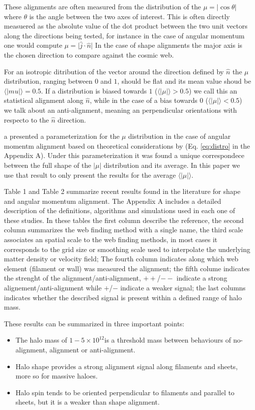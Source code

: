 \documentclass[useAMS,usenatbib]{mn2e}
\newcommand{\hMsun}{{\ifmmode{h^{-1}{\rm
        {M_{\odot}}}}\else{$h^{-1}{\rm{M_{\odot}}}$}\fi}}
\begin{document}
These alignments are often measured from the distribution of the
$\mu=\vert\cos\theta\vert$ where $\theta$ is the angle between the two axes of
interest. This is often directly measuered as the absolute value of
the dot product between the two unit vectors along the directions
being tested, for instance in the case of angular momentum one would compute
$\mu=\vert\hat{j}\cdot\hat{n}\vert$ In the case of shape alignments the major
axis is the chosen direction to compare against the cosmic web. 

For an isotropic ditribution of the vector around the direction defined by
$\hat{n}$ the $\mu$ distribution, ranging between $0$ and $1$, should
be flat and its mean value shoud be
$\langle|mu|\rangle=0.5$. If a distribution is biased towards $1$
($\langle\vert\mu\vert\rangle>0.5$) we call this an statistical
alignment along $\hat{n}$, while in the case of a bias towards $0$
($\langle\vert\mu\vert\rangle<0.5$) we talk about an anti-alignment,
meaning an perpendicular orientations with respecto to the $\hat{n}$
direction. 

a \cite{Trowland2013} presented a parameterization for the $\mu$
distribution in the case of angular momentm alignment based on
theoretical considerations by \cite{Lee2005} (Eq. \ref{eq:distro} in
the Appendix A). Under this parameterization it was found a unique
correspondece between the full shape of the $\vert\mu\vert$
distribution and its average. In this paper we use that result to only
present the results for the average $\langle\vert\mu\vert\rangle$. 

Table 1 and Table 2 summarize recent results found in the literature for
shape and angular momentum alignment. The Appendix A includes a detailed
description of the definitions, algorithms and simulations used in
each one of these studies. In these tables the first column describe
the reference, the second column summarizes the web finding method
with a single name, the third scale associates an spatial scale to the
web finding methods, in most cases it corresponds to the grid size or
smoothing scale used to interpolate the underlying matter density or
velocity field; The fourth column indicates along which web element
(filament or wall) was measured the alignment; the fifth colume
indicates the strenght of the alignment/anti-alignment, $++$/$--$
indicate a strong alignement/anti-alignment while $+$/$-$ indicate a
weaker signal; the last columns indicates whether the described signal
is present within a defined range of halo mass.

These results can be summarized in three important points:
\begin{itemize}
\item The halo mass of $1-5\times 10^{12}$\hMsun is a threshold mass between
behaviours of no-alignment, alignment or anti-alignment.
\item Halo shape provides a strong alignment signal along filaments
  and sheets, more so for massive haloes. 
\item Halo spin tends to be oriented perpendicular to filaments and
parallel to sheets, but it is a weaker than shape alignment. 
\end{itemize}
\end{document}

